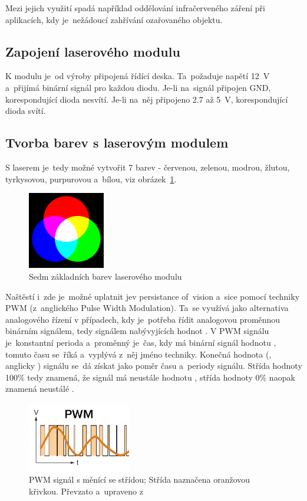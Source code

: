 Mezi jejich využití spadá například oddělování infračerveného záření při aplikacích, kdy je~nežádoucí zahřívání ozařovaného objektu.

\subsection{Zapojení laserového modulu}
K modulu je~od výroby připojená řídící deska. Ta~požaduje napětí 12~V a~přijímá binární signál pro každou diodu. Je-li na~signál připojen GND, korespondující dioda nesvítí. Je-li na~něj připojeno 2.7 až 5~V, korespondující dioda svítí.

\subsection{Tvorba barev s laserovým modulem}
S laserem je~tedy možné vytvořit 7 barev - červenou, zelenou, modrou, žlutou, tyrkysovou, purpurovou a~bílou, viz obrázek~\ref{fig:7colors}.

\begin{figure}[htb]
  \centering
  \includegraphics[width=0.3\textwidth]{img/7colors.png}
  \caption{\label{fig:7colors} Sedm základních barev laserového modulu}
\end{figure}

Naštěstí i~zde je~možné uplatnit jev persistance of~vision a~sice pomocí techniky PWM (z~anglického Pulse Width Modulation). Ta~se využívá jako alternativa analogového řízení v případech, kdy je~potřeba řídit analogovou proměnnou binárním signálem, tedy signálem nabývyjících hodnot .
V PWM signálu je~konstantní perioda a~proměnný je~čas, kdy má binární signál hodnotu , tomuto času se~říká  a~vyplývá z~něj jméno techniky. Konečná hodnota (, anglicky ) signálu se~dá získat jako poměr času  a~periody signálu. Střída hodnoty 100\% tedy znamená, že signál má neustále hodnotu , střída hodnoty 0\% naopak znamená neustálé .~\cite{pwm}\cite{wiki_pwm}

\begin{figure}[htb]
  \centering
  \includegraphics[width=0.4\textwidth]{img/pwm.jpg}
  \caption{\label{fig:pwm} PWM signál s měnící se střídou; Střída naznačena oranžovou křivkou. Převzato a~upraveno z~\cite{pwm-image}}
\end{figure}

